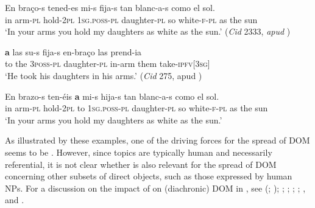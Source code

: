 \documentclass[output=paper]{LSP/langsci}
\begin{document}
\ea \label{08-ga-ex:7}
\gll En braço-s tened-es mi-s fija-s tan blanc-a-s como el sol.\\
in arm-\textsc{pl} hold-2\textsc{pl} \textsc{1sg.poss}-\textsc{pl} daughter-\textsc{pl} so white-\textsc{f-pl} as the sun\\
\glt ‘In your arms you hold my daughters as white as the sun.’ (\textit{Cid} 2333, \textit{apud} \citealt[455]{Laca2006Objeto})
\z

\ea \label{08-ga-ex:8}
\gll \textbf{a} las su-s fija-s en-braço las prend-ia\\
to the 3\textsc{poss-pl} daughter-\textsc{pl} in-arm them take-\textsc{ipfv[3sg}]\\
\glt ‘He took his daughters in his arms.’ (\textit{Cid} 275, apud \citealt[428]{Laca2006Objeto})
\z

\ea \label{08-ga-ex:9}
\gll En brazo-s ten-éis \textbf{a} mi-s hija-s tan blanc-a-s como el sol.\\
in arm-\textsc{pl} hold-2\textsc{pl} to \textsc{1sg.poss}-\textsc{pl} daughter-\textsc{pl} so white-\textsc{f-pl} as the sun\\
\glt ‘In your arms you hold my daughters as white as the sun.’
\z

As illustrated by these examples, one of the driving forces for the spread of DOM seems to be . However, since topics are typically human and necessarily referential, it is not clear whether  is also relevant for the spread of DOM concerning other subsets of direct objects, such as those expressed by human  NPs. For a discussion on the impact of  on (diachronic) DOM in , see 
\citeauthor{Laca1995Acusativo} (\citeyear[85--89]{Laca1995Acusativo};  \citeyear[455--456]{Laca2006Objeto}); 
\citet[134, 161]{Melis1995Objetodirecto}; 
\citet[196--225]{Pensado1995Creacion};
\citet[85]{Delbecque2002Construction}; 
\citet[86--107]{Leonetti2004Specificity}; 
\citet[41--45]{vonHeusingeretal2005Evolution}, and
\citet[ch. 8.5.2]{IemmoloBookDifferential}. %
\end{document}
